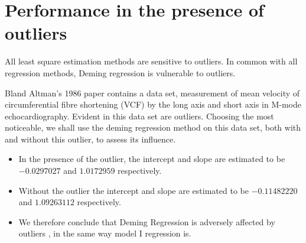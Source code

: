 \documentclass[12pt, a4paper]{report}
\theoremstyle{plain}
\theoremstyle{definition}
\theoremstyle{remark}
\begin{document}
\section{Performance in the presence of outliers}
All least square estimation methods are sensitive to outliers.
In common with all regression methods, Deming regression is vulnerable to outliers. 

Bland Altman's 1986 paper contains a data set, measurement of mean velocity of circumferential fibre shortening (VCF) by the long axis and short axis in M-mode echocardiography. Evident in this data set are outliers. Choosing the most noticeable, we shall use the deming regression method on this data set, both with and
without this outlier, to assess its influence.
\begin{itemize}
	\item In the presence of the outlier, the intercept and slope are estimated to be $-0.0297027$ and $1.0172959$ respectively.
	\item Without the outlier the intercept and slope are estimated to be
	$-0.11482220$ and  $1.09263112$ respectively.
	\item We therefore conclude that Deming Regression is adversely affected
	by outliers , in the same way model I regression is.
\end{itemize}










\end{document}
